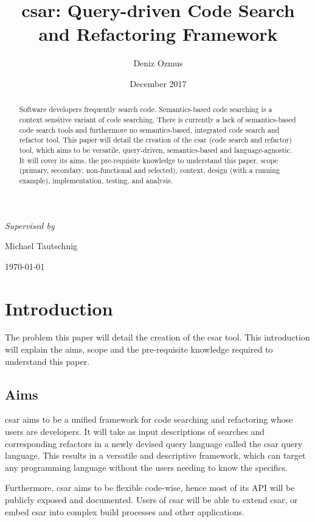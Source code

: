 \documentclass[12pt, letterpaper]{article}
\title{csar: Query-driven Code Search and Refactoring Framework}
\author{Deniz Ozmus}
\date{December 2017}
\def \supervisor {Michael Tautschnig}
\begin{document}
\begin{titlepage}
  \centering
  {\Large \MyTitle\par}
  \vspace{5cm}
  {\MyAuthor\par}
  \vspace{0.5cm}
  {\itshape Supervised by }{ \supervisor\par}
  \vspace{12cm}
  {\today\par}
\end{titlepage}

\begin{abstract}
  Software developers frequently search code.
  Semantics-based code searching is a context sensitive variant of code searching.
  There is currently a lack of semantics-based code search tools and furthermore no semantics-based, integrated code search and refactor tool.
  This paper will detail the creation of the csar (code search and refactor) tool, which aims to be versatile, query-driven, semantics-based and language-agnostic.
  It will cover its aims, the pre-requisite knowledge to understand this paper, scope (primary, secondary, non-functional and selected), context, design (with a running example), implementation, testing, and analysis.
\end{abstract}
\newpage

\tableofcontents
\newpage

\section{Introduction}
The problem this paper will detail the creation of the csar tool.
This introduction will explain the aims, scope and the pre-requisite knowledge required to understand this paper.

\subsection{Aims}
csar aims to be a unified framework for code searching and refactoring whose users are developers.
It will take as input descriptions of searches and corresponding refactors in a newly devised query language called the csar query language.
This results in a versatile and descriptive framework, which can target any programming language without the users needing to know the specifics.

Furthermore, csar aims to be flexible code-wise, hence most of its API will be publicly exposed and documented.
Users of csar will be able to extend csar, or embed csar into complex build processes and other applications.
\end{document}
